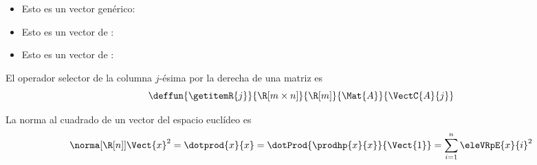 \documentclass{article}
\begin{document}
\begin{itemize}
\item Esto es un vector genérico:\; 
\item Esto es un vector de \R[n]:\; 
\item Esto es un vector de \R[m\times n]:\; 
\end{itemize}

El operador selector de la columna $j$-ésima por la derecha de una matriz es
\begin{displaymath}
  \deffun{\getitemR{j}}{\R[m\times n]}{\R[m]}{\Mat{A}}{\VectC{A}{j}}
\end{displaymath}


La norma al cuadrado de un vector del espacio euclídeo \R[n] es
\[
  \norma[\R[n]]{\Vect{x}}^2=\dotprod{x}{x}=\dotProd{\prodhp{x}{x}}{\Vect{1}}=\sum_{i=1}^n\eleVRpE{x}{i}^2
\]
\end{document}
